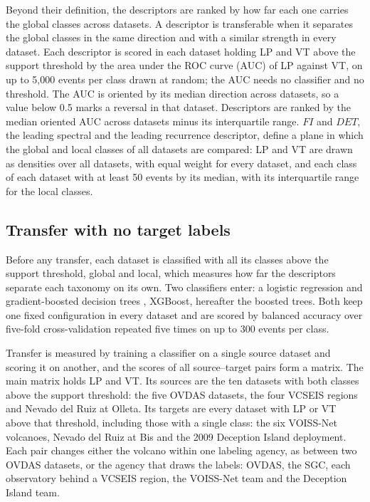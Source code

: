 \documentclass[pdflatex,sn-mathphys-num]{sn-jnl}
\begin{document}
Beyond their definition, the descriptors are ranked by how far each one
carries the global classes across datasets. A descriptor is transferable when
it separates the global classes in the same direction and with a similar
strength in every dataset. Each descriptor is scored in each dataset holding LP and VT above the
support threshold by the area under the ROC curve (AUC) of LP against VT,
on up to 5{,}000 events per class drawn at random; the AUC needs no
classifier and no threshold. The AUC is oriented by its median direction
across datasets, so a value below 0.5 marks a reversal in that dataset.
Descriptors are ranked by the median oriented AUC across datasets minus its
interquartile range.
$FI$ and $DET$, the leading spectral and the leading recurrence descriptor,
define a plane in which the global and local classes of all datasets are
compared: LP and VT are drawn as densities over all datasets, with equal
weight for every dataset, and each class of each dataset with at least 50
events by its median, with its interquartile range for the local classes.

\subsection{Transfer with no target labels}\label{subsec:transfer}

Before any transfer, each dataset is classified with all its classes above
the support threshold, global and local, which measures how far the
descriptors separate each taxonomy on its own. Two classifiers enter: a
logistic regression and gradient-boosted decision trees
\cite{chen_xgboost_2016}, XGBoost, hereafter the boosted trees. Both keep
one fixed configuration in every dataset and are scored by balanced
accuracy over five-fold cross-validation repeated five times on up to 300
events per class.

Transfer is measured by training a classifier on a single source dataset
and scoring it on another, and the scores of all source--target pairs form
a matrix. The main matrix holds LP and VT. Its sources are the ten datasets
with both classes above the support threshold: the five OVDAS datasets, the
four VCSEIS regions and Nevado del Ruiz at Olleta. Its targets are every
dataset with LP or VT above that threshold, including those with a single
class: the six VOISS-Net volcanoes, Nevado del Ruiz at Bis and the 2009
Deception Island deployment. Each pair changes either the volcano within one
labeling agency, as between two OVDAS datasets, or the agency that draws the
labels: OVDAS, the SGC, each observatory behind a VCSEIS region, the
VOISS-Net team and the Deception Island team.
\end{document}

